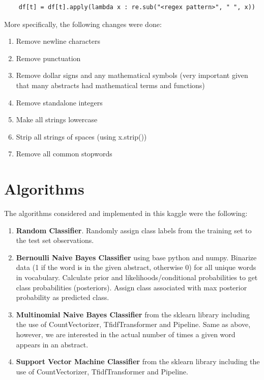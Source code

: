 \documentclass[a4paper,12pt]{article}
\begin{document}
\begin{verbatim}
    df[t] = df[t].apply(lambda x : re.sub("<regex pattern>", " ", x))
\end{verbatim}

More specifically, the following changes were done:

\begin{enumerate}
    \item Remove newline characters
    \item Remove punctuation
    \item Remove dollar signs and any mathematical symbols (very important given that many abstracts had mathematical terms and functions)
    \item Remove standalone integers 
    \item Make all strings lowercase
    \item Strip all strings of spaces (using x.strip())
    \item Remove all common stopwords
\end{enumerate}

\section{Algorithms}

The algorithms considered and implemented in this kaggle were the following:
\begin{enumerate}
    \item \textbf{Random Classifier}. Randomly assign class labels from the training set to the test set observations.
    \item \textbf{Bernoulli Naive Bayes Classifier} using base python and numpy. Binarize data (1 if the word is in the given abstract, otherwise 0) for all unique words in vocabulary. Calculate prior and likelihoods/conditional probabilities to get class probabilities (posteriors). Assign class associated with max posterior probability as predicted class.
    \item \textbf{Multinomial Naive Bayes Classifier} from the sklearn library including the use of CountVectorizer, TfidfTransformer and Pipeline. Same as above, however, we are interested in the actual number of times a given word appears in an abstract.
    \item \textbf{Support Vector Machine Classifier} from the sklearn library including the use of CountVectorizer, TfidfTransformer and Pipeline.
\end{enumerate}
\end{document}
